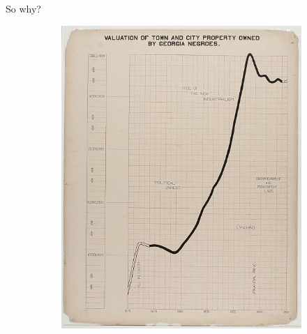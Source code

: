 \documentclass[xcolor={dvipsnames}, handout]{beamer}
\begin{document}
\begin{frame}{So why?}
\begin{figure}[H]
\begin{subfigure}{.24\textwidth}
            \includegraphics[width=1\textwidth]{figures/intro/du_bois_line.png}
            \caption{}
            \label{fig:intro_dpb}
        \end{subfigure}
        \begin{subfigure}{.24\textwidth}

\end{subfigure}
\end{figure}
\end{frame}
\end{document}
